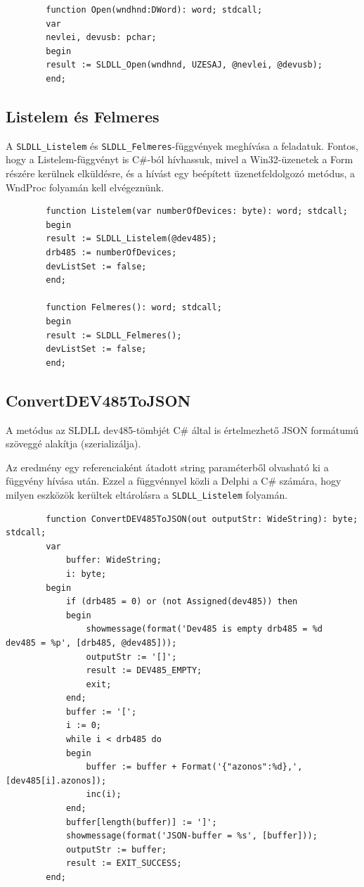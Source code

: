 \documentclass[tocnopagenum]{thesis-ekf}
\theoremstyle{definition}
\theoremstyle{remark}
\begin{document}
	\begin{verbatim}
		function Open(wndhnd:DWord): word; stdcall;
		var
		nevlei, devusb: pchar;
		begin
		result := SLDLL_Open(wndhnd, UZESAJ, @nevlei, @devusb); 
		end;
	\end{verbatim}

	\subsection{Listelem és Felmeres} A \verb*|SLDLL_Listelem| és \verb*|SLDLL_Felmeres|-függvények meghívása a feladatuk. Fontos, hogy a Listelem-függvényt is C\#-ból hívhassuk, mivel a Win32-üzenetek a Form részére kerülnek elküldésre, és a hívást egy beépített üzenetfeldolgozó metódus, a WndProc folyamán kell elvégeznünk.
	
	\begin{verbatim}
		function Listelem(var numberOfDevices: byte): word; stdcall;
		begin
		result := SLDLL_Listelem(@dev485);
		drb485 := numberOfDevices;
		devListSet := false;
		end;
		
		function Felmeres(): word; stdcall;
		begin
		result := SLDLL_Felmeres();
		devListSet := false;
		end;
	\end{verbatim}

	\subsection{ConvertDEV485ToJSON}
	A metódus az SLDLL dev485-tömbjét C\# által is értelmezhető JSON formátumú szöveggé alakítja (szerializálja). 
	
	Az eredmény egy referenciaként átadott string paraméterből olvasható ki a függvény hívása után. Ezzel a függvénnyel közli a Delphi a C\# számára, hogy milyen eszközök kerültek eltárolásra a \verb*|SLDLL_Listelem| folyamán.
	\begin{verbatim}
		function ConvertDEV485ToJSON(out outputStr: WideString): byte; stdcall;
		var
			buffer: WideString;
			i: byte;
		begin
			if (drb485 = 0) or (not Assigned(dev485)) then
			begin
				showmessage(format('Dev485 is empty drb485 = %d  dev485 = %p', [drb485, @dev485]));
				outputStr := '[]';
				result := DEV485_EMPTY;
				exit;
			end;
			buffer := '[';
			i := 0;
			while i < drb485 do
			begin
				buffer := buffer + Format('{"azonos":%d},', [dev485[i].azonos]);
				inc(i);
			end;
			buffer[length(buffer)] := ']'; 
			showmessage(format('JSON-buffer = %s', [buffer]));
			outputStr := buffer;
			result := EXIT_SUCCESS;
		end;
	\end{verbatim}
\end{document}
